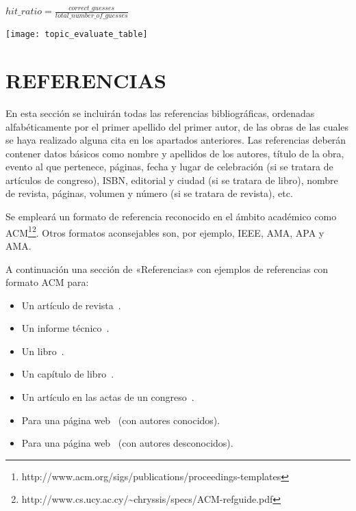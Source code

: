 \documentclass{pre-tfg}
\begin{document}
$hit\_ratio = \frac{correct\_guesses}{total\_number\_of\_guesses}$


\texttt{[image: topic\_evaluate\_table]}

\section{REFERENCIAS}

En esta sección se incluirán todas las referencias bibliográficas, ordenadas
alfabéticamente por el primer apellido del primer autor, de las obras de las cuales se
haya realizado alguna cita en los apartados anteriores. Las referencias deberán contener
datos básicos como nombre y apellidos de los autores, título de la obra, evento al que
pertenece, páginas, fecha y lugar de celebración (si se tratara de artículos de congreso),
ISBN, editorial y ciudad (si se tratara de libro), nombre de revista, páginas, volumen y
número (si se tratara de revista), etc.

Se empleará un formato de referencia reconocido en el ámbito académico como
ACM\footnote{http://www.acm.org/sigs/publications/proceedings-templates}\footnote{http://www.cs.ucy.ac.cy/\~{}chryssis/specs/ACM-refguide.pdf}.
Otros formatos aconsejables son, por ejemplo, IEEE, AMA, APA y AMA.

A continuación una sección de «Referencias» con ejemplos de referencias con formato ACM para:

\begin{itemize}
\item Un artículo de revista~\cite{Bow93}.
\item Un informe técnico~\cite{Ding97}.
\item Un libro~\cite{Tavel07}.
\item Un capítulo de libro~\cite{Greiner99}.
\item Un artículo en las actas de un congreso~\cite{Frohlic00}.
\item Para una página web~\cite{Steele04} (con autores conocidos).
\item Para una página web~\cite{Oxygen} (con autores desconocidos).
\end{itemize}



\singlespacing

\end{document}
